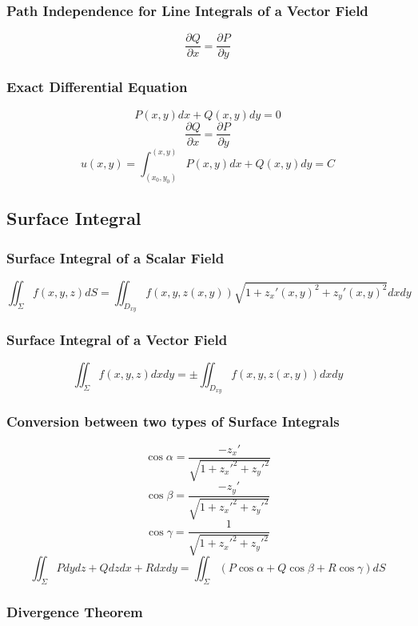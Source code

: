 \documentclass{article}
\begin{document}
\subsubsection{Path Independence for Line Integrals of a Vector Field}

\[
    \frac{\partial Q}{\partial x} = \frac{\partial P}{\partial y}
\]

\subsubsection{Exact Differential Equation}

\[
    P(x, y) dx + Q(x, y) dy = 0
\]
\[
    \frac{\partial Q}{\partial x} = \frac{\partial P}{\partial y}
\]
\[
    u(x, y) = \int_{(x_0, y_0)}^{(x, y)} P(x, y) dx + Q(x, y) dy = C
\]

\subsection{Surface Integral}

\subsubsection{Surface Integral of a Scalar Field}

\[
    \iint_\Sigma f(x, y, z) dS = \iint_{D_{xy}} f(x, y, z(x, y)) \sqrt{1 + z_x'(x, y)^2 + z_y'(x, y)^2} dx dy
\]

\subsubsection{Surface Integral of a Vector Field}

\[
    \iint_\Sigma f(x, y, z) dx dy = \pm \iint_{D_{xy}} f(x, y, z(x, y)) dx dy
\]

\subsubsection{Conversion between two types of Surface Integrals}

\[
    \cos \alpha = \frac{-z_x'}{\sqrt{1 + z_x'^2 + z_y'^2}}
\]
\[
    \cos \beta = \frac{-z_y'}{\sqrt{1 + z_x'^2 + z_y'^2}}
\]
\[
    \cos \gamma = \frac{1}{\sqrt{1 + z_x'^2 + z_y'^2}}
\]
\[
    \iint_\Sigma P dy dz + Q dz dx + R dx dy = \iint_\Sigma (P \cos \alpha + Q \cos \beta + R \cos \gamma) dS
\]

\subsubsection{Divergence Theorem}
\end{document}
